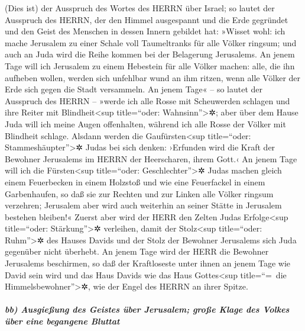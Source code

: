  (Dies ist) der Ausspruch des Wortes des HERRN über
Israel; so lautet der Ausspruch des HERRN, der den Himmel ausgespannt
und die Erde gegründet und den Geist des Menschen in dessen Innern
gebildet hat:  »Wisset wohl: ich mache Jerusalem zu einer
Schale voll Taumeltranks für alle Völker ringsum; und auch an Juda wird
die Reihe kommen bei der Belagerung Jerusalems.  An jenem
Tage will ich Jerusalem zu einem Hebestein für alle Völker machen: alle,
die ihn aufheben wollen, werden sich unfehlbar wund an ihm ritzen, wenn
alle Völker der Erde sich gegen die Stadt versammeln.  An
jenem Tage« -- so lautet der Ausspruch des HERRN -- »werde ich alle
Rosse mit Scheuwerden schlagen und ihre Reiter mit
Blindheit\textless sup title=``oder: Wahnsinn''\textgreater✲; aber über
dem Hause Juda will ich meine Augen offenhalten, während ich alle Rosse
der Völker mit Blindheit schlage.  Alsdann werden die
Gaufürsten\textless sup title=``oder: Stammeshäupter''\textgreater✲
Judas bei sich denken: ›Erfunden wird die Kraft der Bewohner Jerusalems
im HERRN der Heerscharen, ihrem Gott.‹  An jenem Tage will
ich die Fürsten\textless sup title=``oder: Geschlechter''\textgreater✲
Judas machen gleich einem Feuerbecken in einem Holzstoß und wie eine
Feuerfackel in einem Garbenhaufen, so daß sie zur Rechten und zur Linken
alle Völker ringsum verzehren; Jerusalem aber wird auch weiterhin an
seiner Stätte in Jerusalem bestehen bleiben!«  Zuerst aber
wird der HERR den Zelten Judas Erfolge\textless sup title=``oder:
Stärkung''\textgreater✲ verleihen, damit der Stolz\textless sup
title=``oder: Ruhm''\textgreater✲ des Hauses Davids und der Stolz der
Bewohner Jerusalems sich Juda gegenüber nicht überhebt. 
An jenem Tage wird der HERR die Bewohner Jerusalems beschirmen, so daß
der Kraftloseste unter ihnen an jenem Tage wie David sein wird und das
Haus Davids wie das Haus Gottes\textless sup title=``=~die
Himmelsbewohner''\textgreater✲, wie der Engel des HERRN an ihrer Spitze.

\hypertarget{bb-ausgieuxdfung-des-geistes-uxfcber-jerusalem-grouxdfe-klage-des-volkes-uxfcber-eine-begangene-bluttat}{%
\subparagraph{bb) Ausgießung des Geistes über Jerusalem; große Klage des
Volkes über eine begangene
Bluttat}\label{bb-ausgieuxdfung-des-geistes-uxfcber-jerusalem-grouxdfe-klage-des-volkes-uxfcber-eine-begangene-bluttat}}

